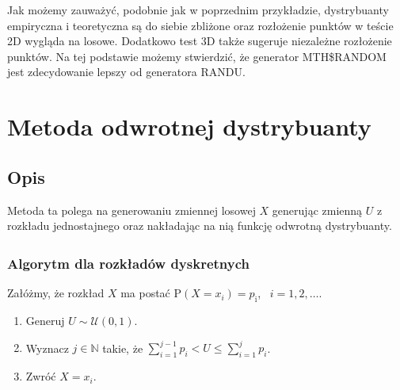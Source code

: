\documentclass[12pt]{mwrep}
\begin{document}
\begin{itemize}[leftmargin=10mm]
\begin{figure}[H]
		\end{figure}
		Jak możemy zauważyć, podobnie jak w poprzednim przykładzie, dystrybuanty empiryczna i teoretyczna są do siebie zbliżone oraz rozłożenie punktów w teście 2D wygląda na losowe. Dodatkowo test 3D także sugeruje niezależne rozłożenie punktów. Na tej podstawie możemy stwierdzić, że generator MTH\$RANDOM jest zdecydowanie lepszy od generatora RANDU.
	\end{itemize}


	
	\section{Metoda odwrotnej dystrybuanty}
	
	\subsection{Opis}
	\noindent Metoda ta polega na generowaniu zmiennej losowej $X$ generując zmienną $U$ z rozkładu jednostajnego oraz nakładając na nią funkcję odwrotną dystrybuanty.
	\subsubsection{Algorytm dla rozkładów dyskretnych\textsuperscript{\cite{OD - dyskretny}}}
	\noindent Załóżmy, że rozkład $X$ ma postać $\mathrm{P}(X = x_i) = p_\mathrm{i}$, \ $i = 1, 2,\dots $.
	\begin{enumerate}[leftmargin=10mm]
		\item Generuj $U \sim \mathcal{U}(0, 1)$.
		\item Wyznacz $j \in \mathbb{N} $ takie, że $ \sum\limits_{i=1}^{j-1} p_i < U \leqslant \sum\limits_{i=1}^{j} p_i $.
		\item Zwróć $ X = x_i $.
	\end{enumerate}
\end{document}
